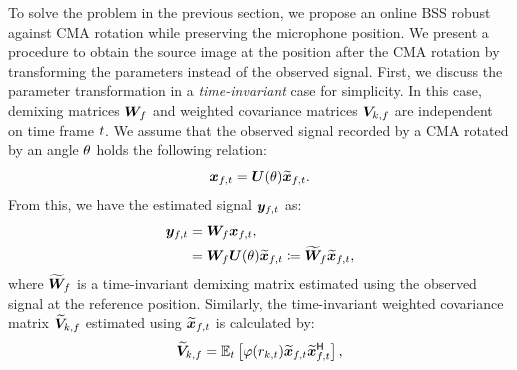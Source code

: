 \documentclass[sip,biber]{now-journal}
\begin{document}
To solve the problem in the previous section, we propose an online BSS robust against CMA rotation while preserving the microphone position.
We present a procedure to obtain the source image at the position after the CMA rotation by transforming the parameters instead of the observed signal.
First, we discuss the parameter transformation in a \emph{time-invariant} case for simplicity.
In this case, demixing matrices $\bm{W} _{f}$ and weighted covariance matrices $\bm{V} _{k,f}$ are independent on time frame $t$.
We assume that the observed signal recorded by a CMA rotated by an angle $\theta$ holds the following relation:
\begin{equation}
  \Obs _{\ft} = \rotMat (\rotSpat) \refpos{\Obs} _{\ft}.
\end{equation}
From this, we have the estimated signal $\Est _{\ft}$ as:
\begin{align}
  \Est _{\ft} &= \Demix _{\freq} \Obs _{\ft}, \\
              &= \Demix _{\freq} \rotMat (\rotSpat) \refpos{\Obs} _{\ft} \coloneqq \refpos{\Demix} _{\freq} \refpos{\Obs} _{\ft}, \label{eq:rt:demix:batch}
\end{align}
where $\widetilde{\bm{W}} _{f}$ is a time-invariant demixing matrix estimated using the observed signal at the reference position.
Similarly, the time-invariant weighted covariance matrix $\widetilde{\bm{V}} _{k,f}$ estimated using $\refpos{\Obs} _{\ft}$ is calculated by:
\begin{equation}
  \refpos{\cov} _{\src,\freq} = \expct  _{\tframe} \left[\weight (\var _{\src,\tframe}) \refpos{\Obs} _{\ft} \refpos{\Obs} _{\ft} ^{\hermite}\right],
\end{equation}
\end{document}
